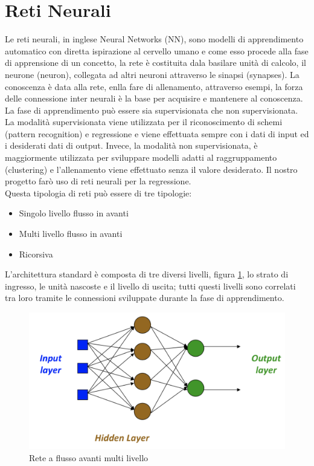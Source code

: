 \documentclass[%
    corpo=12pt,
    twoside,
    oldstyle,
    autoretitolo,
    greek,
    evenboxes,
]{toptesi}
\begin{document}
\section{Reti Neurali}
Le reti neurali, in inglese Neural Networks (NN), sono modelli di apprendimento automatico con diretta ispirazione al cervello umano e come esso procede alla fase di apprensione di un concetto, la rete è costituita dala basilare unità di calcolo, il neurone (neuron), collegata ad altri neuroni attraverso le sinapsi (synapses). La conoscenza è data alla rete, enlla fare di allenamento, attraverso esempi, la forza delle connessione inter neurali è la base per acquisire e mantenere al conoscenza.\\
La fase di apprendimento può essere sia supervisionata che non supervisionata. La modalità supervisionata viene utilizzata per il riconoscimento di schemi (pattern recognition) e regressione e viene effettuata sempre con i dati di input ed i desiderati dati di output. Invece, la modalità non supervisionata, è maggiormente utilizzata per sviluppare modelli adatti al raggruppamento (clustering) e l'allenamento viene effettuato senza il valore desiderato. Il nostro progetto farò uso di reti neurali per la regressione.\\
Questa tipologia di reti può essere di tre tipologie:
\begin{itemize}
  \item Singolo livello flusso in avanti
  \item Multi livello flusso in avanti
  \item Ricorsiva
\end{itemize}
L'architettura standard è composta di tre diversi livelli, figura \ref{fig:mlff}, lo strato di ingresso, le unità nascoste e il livello di uscita; tutti questi livelli sono correlati tra loro tramite le connessioni sviluppate durante la fase di apprendimento.
\begin{figure}[!ht]
  \includegraphics[width=\linewidth]{figure/feed_foward.png}
  \caption{Rete a flusso avanti multi livello}
  \label{fig:mlff}
\end{figure}
\end{document}
